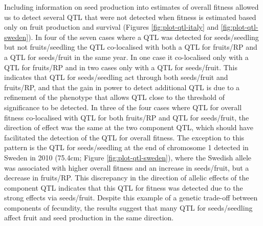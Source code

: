 \documentclass[
]{article}
\begin{document}
Including information on seed production into estimates of overall fitness allowed us to detect several QTL that were not detected when fitness is estimated based only on fruit production and survival (Figures \ref{fig:plot-qtl-italy} and \ref{fig:plot-qtl-sweden}). In four of the seven cases where a QTL was detected for seeds/seedling but not fruits/seedling the QTL co-localised with both a QTL for fruits/RP and a QTL for seeds/fruit in the same year. In one case it co-localised only with a QTL for fruits/RP and in two cases only with a QTL for seeds/fruit. This indicates that QTL for seeds/seedling act through both seeds/fruit and fruits/RP, and that the gain in power to detect additional QTL is due to a refinement of the phenotype that allows QTL close to the threshold of significance to be detected. In three of the four cases where QTL for overall fitness co-localised with QTL for both fruits/RP and QTL for seeds/fruit, the direction of effect was the same at the two component QTL, which should have facilitated the detection of the QTL for overall fitness. The exception to this pattern is the QTL for seeds/seedling at the end of chromosome 1 detected in Sweden in 2010 (75.4cm; Figure \ref{fig:plot-qtl-sweden}), where the Swedish allele was associated with higher overall fitness and an increase in seeds/fruit, but a decrease in fruits/RP. This discrepancy in the direction of allelic effects of the component QTL indicates that this QTL for fitness was detected due to the strong effects via seeds/fruit. Despite this example of a genetic trade-off between components of fecundity, the results suggest that many QTL for seeds/seedling affect fruit and seed production in the same direction.
\end{document}
